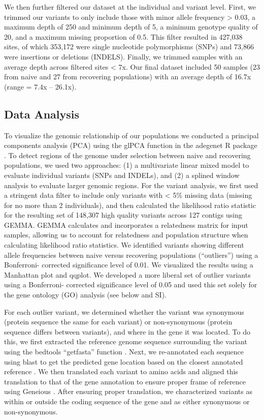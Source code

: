 \documentclass[9pt,twocolumn,twoside,lineno]{pnas-new}
\begin{document}
{We then further filtered our dataset at the individual and variant
level. First, we trimmed our variants to only include those with minor
allele frequency \textgreater{} 0.03, a maximum depth of 250 and minimum
depth of 5, a minimum genotype quality of 20, and a maximum missing
proportion of 0.5. This filter resulted in 427,038 sites, of which
353,172 were single nucleotide polymorphisms (SNPs) and 73,866 were
insertions or deletions (INDELS). Finally, we trimmed samples with an
average depth across filtered sites \textless{} 7x. Our final dataset
included 50 samples (23 from naive and 27 from recovering populations)
with an average depth of 16.7x (range = 7.4x -- 26.1x).

\hypertarget{data-analysis}{%
\subsection*{Data Analysis}\label{data-analysis}}

To visualize the genomic relationship of our populations we conducted a
principal components analysis (PCA) using the glPCA function in the
adegenet R package \citep{jombart2008}. To detect regions of the genome
under selection between naive and recovering populations, we used two
approaches: (1) a multivariate linear mixed model to evaluate individual
variants (SNPs and INDELs), and (2) a splined window analysis to
evaluate larger genomic regions. For the variant analysis, we first used
a stringent data filter to include only variants with \textless{} 5\%
missing data (missing for no more than 2 individuals), and then
calculated the likelihood ratio statistic for the resulting set of
148,307 high quality variants across 127 contigs using GEMMA. GEMMA
calculates and incorporates a relatedness matrix for input samples,
allowing us to account for relatedness and population structure when
calculating likelihood ratio statistics. We identified variants showing
different allele frequencies between naive versus recovering populations
(``outliers'') using a Bonferroni- corrected significance level of 0.01.
We visualized the results using a Manhattan plot and qqplot. We
developed a more liberal set of outlier variants using a Bonferroni-
corrected significance level of 0.05 and used this set solely for the
gene ontology (GO) analysis (see below and SI).

For each outlier variant, we determined whether the variant was
synonymous (protein sequence the same for each variant) or
non-synonymous (protein sequence differs between variants), and where in
the gene it was located. To do this, we first extracted the reference
genome sequence surrounding the variant using the bedtools ``getfasta''
function \citep{quinlan2010}. Next, we re-annotated each sequence using
blast to get the predicted gene location based on the closest annotated
reference \citep{altschul1997}. We then translated each variant to amino
acids and aligned this translation to that of the gene annotation to
ensure proper frame of reference using Geneious \citep{kearse2012}.
After ensuring proper translation, we characterized variants as within
or outside the coding sequence of the gene and as either synonymous or
non-synonymous.

}
\end{document}
